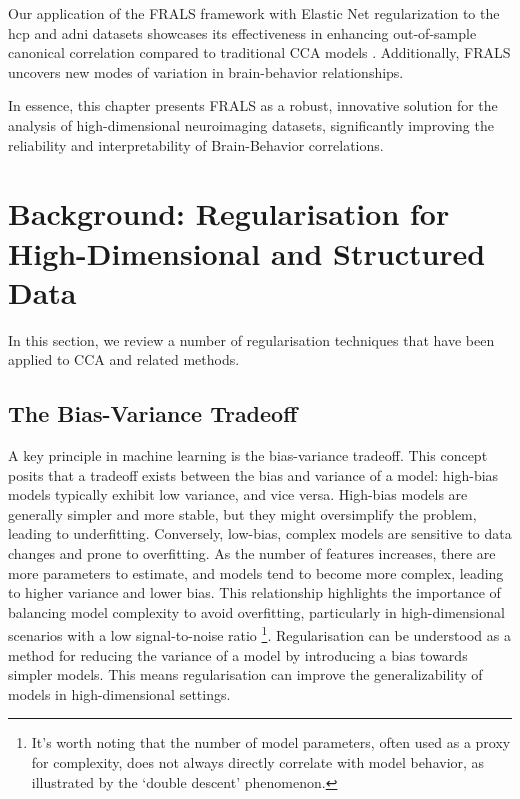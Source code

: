 Our application of the FRALS framework with Elastic Net regularization to the \acrshort{hcp} and \acrshort{adni} datasets showcases its effectiveness in enhancing out-of-sample canonical correlation compared to traditional CCA models \citep{citation}. Additionally, FRALS uncovers new modes of variation in brain-behavior relationships.

In essence, this chapter presents FRALS as a robust, innovative solution for the analysis of high-dimensional neuroimaging datasets, significantly improving the reliability and interpretability of Brain-Behavior correlations.

\section{Background: Regularisation for High-Dimensional and Structured Data}\label{sec:background}

In this section, we review a number of regularisation techniques that have been applied to CCA and related methods.

\subsection{The Bias-Variance Tradeoff}

A key principle in machine learning is the bias-variance tradeoff.
This concept posits that a tradeoff exists between the bias and variance of a model: high-bias models typically exhibit low variance, and vice versa.
High-bias models are generally simpler and more stable, but they might oversimplify the problem, leading to underfitting.
Conversely, low-bias, complex models are sensitive to data changes and prone to overfitting.
As the number of features increases, there are more parameters to estimate, and models tend to become more complex, leading to higher variance and lower bias.
This relationship highlights the importance of balancing model complexity to avoid overfitting, particularly in high-dimensional scenarios with a low signal-to-noise ratio \citep{mcintosh2021comparison}\footnote{It's worth noting that the number of model parameters, often used as a proxy for complexity, does not always directly correlate with model behavior, as illustrated by the `double descent' phenomenon.}.
Regularisation can be understood as a method for reducing the variance of a model by introducing a bias towards simpler models.
This means regularisation can improve the generalizability of models in high-dimensional settings.

